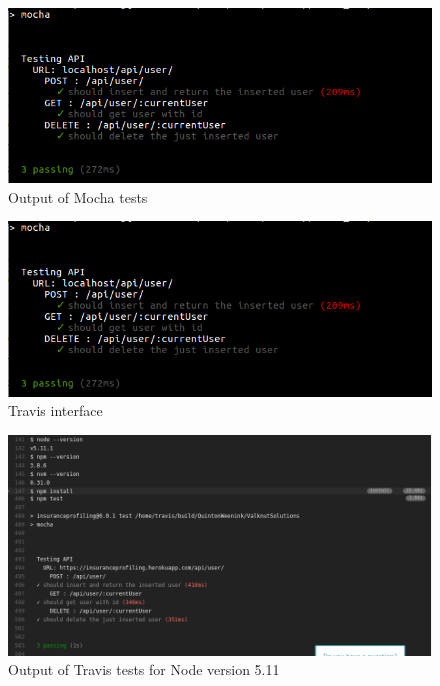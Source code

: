 \documentclass{article}
\begin{document}
\begin{figure}[H]
  \centering
      \includegraphics[width=\textwidth]{images/tests.png}
  \caption{Output of Mocha tests}
\end{figure}

\begin{figure}[H]
  \centering
      \includegraphics[width=\textwidth]{images/tests.png}
  \caption{Travis interface}
\end{figure}

\begin{figure}[H]
  \centering
      \includegraphics[width=\textwidth]{images/5_11.png}
  \caption{Output of Travis tests for Node version 5.11}
\end{figure}
\end{document}
